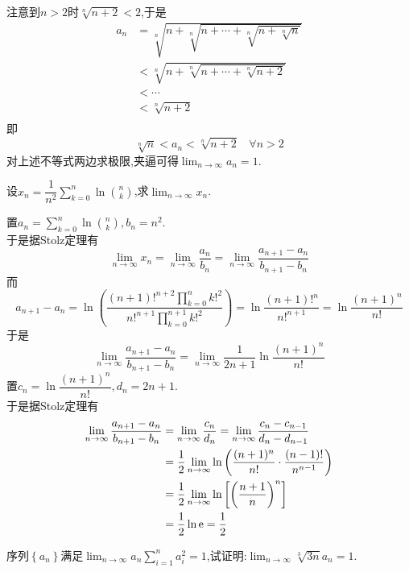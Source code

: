 \documentclass{ctexart}
\begin{document}
\begin{solution}[Proof.]
    注意到$n>2$时$\sqrt[n]{n+2}<2$,于是
    $$\begin{aligned}
        a_n
        &= \sqrt[n]{n+\sqrt[n]{n+\cdots+\sqrt[n]{n+\sqrt[n]{n}}}} \\
        &< \sqrt[n]{n+\sqrt[n]{n+\cdots+\sqrt[n]{n+2}}} \\
        &< \cdots \\
        &< \sqrt[n]{n+2} \\
    \end{aligned}$$
    即$$\sqrt[n]{n}<a_n<\sqrt[n]{n+2}\ \ \ \ \forall n>2$$
    对上述不等式两边求极限,夹逼可得$\displaystyle\lim_{n\to\infty}a_n=1$.
\end{solution}
\begin{problem}[Problem 8.]
    设$\displaystyle x_n=\dfrac{1}{n^2}\sum_{k=0}^{n}\ln{\binom{n}{k}}$,求$\displaystyle\lim_{n\to\infty}x_n$.
\end{problem}
\begin{solution}[Solution.]
    置$\displaystyle a_n=\sum_{k=0}^{n}\ln{\binom{n}{k}},b_n=n^2$.\\
    于是据Stolz定理有
    $$\lim_{n\to\infty}x_n=\lim_{n\to\infty}\dfrac{a_n}{b_n}=\lim_{n\to\infty}\dfrac{a_{n+1}-a_n}{b_{n+1}-b_n}$$
    而$$a_{n+1}-a_n=\ln{\left(\dfrac{(n+1)!^{n+2}\prod_{k=0}^{n}k!^2}{n!^{n+1}\prod_{k=0}^{n+1}k!^2}\right)}=\ln\dfrac{(n+1)!^n}{n!^{n+1}}=\ln\dfrac{(n+1)^n}{n!}$$
    于是$$\lim_{n\to\infty}\dfrac{a_{n+1}-a_n}{b_{n+1}-b_n}=\lim_{n\to\infty}\dfrac{1}{2n+1}\ln\dfrac{(n+1)^n}{n!}$$
    置$c_n=\ln\dfrac{(n+1)^n}{n!},d_n=2n+1$.\\
    于是据Stolz定理有
    $$\begin{aligned}
        \lim_{n\to\infty}\dfrac{a_{n+1}-a_n}{b_{n+1}-b_n}
        &= \lim_{n\to\infty}\dfrac{c_n}{d_n} = \lim_{n\to\infty}\dfrac{c_n-c_{n-1}}{d_n-d_{n-1}} \\
        &= \dfrac{1}{2}\lim_{n\to\infty}\ln\left(\dfrac{(n+1)^n}{n!}\cdot\dfrac{(n-1)!}{n^{n-1}}\right) \\
        &= \dfrac{1}{2}\lim_{n\to\infty}\ln\left[\left(\dfrac{n+1}{n}\right)^n\right] \\
        &= \dfrac{1}{2}\ln\mathrm{e} = \dfrac{1}{2}
    \end{aligned}$$
\end{solution}
\begin{problem}[Problem 9.]
    序列$\left\{a_n\right\}$满足$\displaystyle\lim_{n\to\infty}a_n\sum_{i=1}^{n}a_i^2=1$,试证明:$\displaystyle\lim_{n\to\infty}\sqrt[3]{3n}a_n=1$.
\end{problem}
\end{document}
